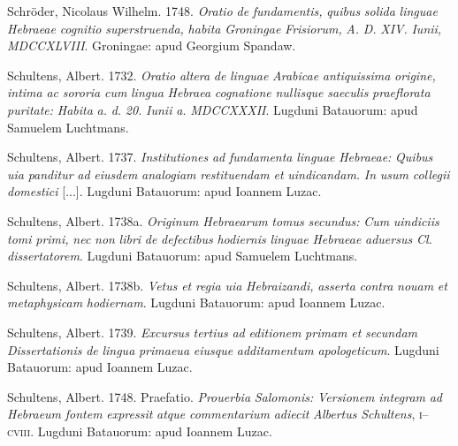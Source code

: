 Schröder, Nicolaus Wilhelm. 1748. \textit{Oratio} \textit{de} \textit{fundamentis,} \textit{quibus} \textit{solida} \textit{linguae} \textit{Hebraeae} \textit{cognitio} \textit{superstruenda,} \textit{habita} \textit{Groningae} \textit{Frisiorum,} \textit{A.} \textit{D.} \textit{XIV.} \textit{Iunii,} \textit{MDCCXLVIII}. Groningae: apud Georgium Spandaw.

Schultens, Albert. 1732. \textit{Oratio} \textit{altera} \textit{de} \textit{linguae} \textit{Arabicae} \textit{antiquissima} \textit{origine,} \textit{intima} \textit{ac} \textit{sororia} \textit{cum} \textit{lingua} \textit{Hebraea} \textit{cognatione} \textit{nullisque} \textit{saeculis} \textit{praeflorata} \textit{puritate:} \textit{Habita} \textit{a.} \textit{d.} \textit{20.} \textit{Iunii} \textit{a.} \textit{MDCCXXXII}. Lugduni Batauorum: apud Samuelem Luchtmans.

Schultens, Albert. 1737. \textit{Institutiones} \textit{ad} \textit{fundamenta} \textit{linguae} \textit{Hebraeae:} \textit{Quibus} \textit{uia} \textit{panditur} \textit{ad} \textit{eiusdem} \textit{analogiam} \textit{restituendam} \textit{et} \textit{uindicandam.} \textit{In} \textit{usum} \textit{collegii} \textit{domestici} [...]. Lugduni Batauorum: apud Ioannem Luzac.

Schultens, Albert. 1738a. \textit{Originum} \textit{Hebraearum} \textit{tomus} \textit{secundus:} \textit{Cum} \textit{uindiciis} \textit{tomi} \textit{primi,} \textit{nec} \textit{non} \textit{libri} \textit{de} \textit{defectibus} \textit{hodiernis} \textit{linguae} \textit{Hebraeae} \textit{aduersus} \textit{Cl.} \textit{dissertatorem}. Lugduni Batauorum: apud Samuelem Luchtmans.

Schultens, Albert. 1738b. \textit{Vetus} \textit{et} \textit{regia} \textit{uia} \textit{Hebraizandi,} \textit{asserta} \textit{contra} \textit{nouam} \textit{et} \textit{metaphysicam} \textit{hodiernam}. Lugduni Batauorum: apud Ioannem Luzac.

Schultens, Albert. 1739. \textit{Excursus} \textit{tertius} \textit{ad} \textit{editionem} \textit{primam} \textit{et} \textit{secundam} \textit{Dissertationis} \textit{de} \textit{lingua} \textit{primaeua} \textit{eiusque} \textit{additamentum} \textit{apologeticum}. Lugduni Batauorum: apud Ioannem Luzac.

Schultens, Albert. 1748. Praefatio. \textit{Prouerbia} \textit{Salomonis:} \textit{Versionem} \textit{integram} \textit{ad} \textit{Hebraeum} \textit{fontem} \textit{expressit} \textit{atque} \textit{commentarium} \textit{adiecit} \textit{Albertus} \textit{Schultens}, \textsc{i}–\textsc{cviii}. Lugduni Batauorum: apud Ioannem Luzac.

